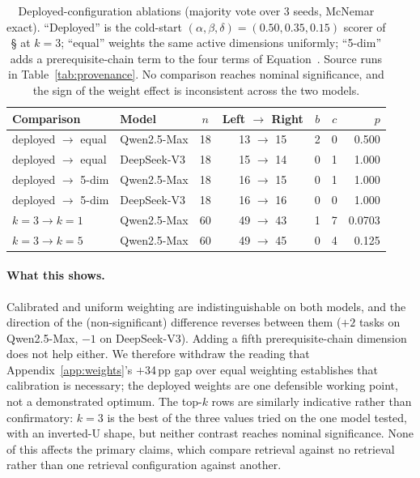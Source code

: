 \documentclass[letterpaper]{article} %
\newcommand{\appref}[1]{Appendix~\ref{#1}}
\newcommand{\bodyref}[1]{\getrefnumber{#1}}
\begin{document}
\begin{table}[htbp]
\centering
\caption{Deployed-configuration ablations (majority vote over 3 seeds,
McNemar exact).  ``Deployed'' is the cold-start
$(\alpha,\beta,\delta){=}(0.50,0.35,0.15)$ scorer of \S\bodyref{sec:scoring} at $k{=}3$;
``equal'' weights the same active dimensions uniformly; ``5-dim'' adds a
prerequisite-chain term to the four terms of Equation~\bodyref{eq:score}.  Source runs in
Table~\ref{tab:provenance}.  No comparison reaches nominal
significance, and the sign of the weight effect is inconsistent across
the two models.}
\label{tab:deployed_ablation}
\small
\begin{tabular}{llccccr}
\toprule
Comparison & Model & $n$ & Left $\rightarrow$ Right & $b$ & $c$ & $p$ \\
\midrule
deployed $\rightarrow$ equal & Qwen2.5-Max & 18 & 13 $\rightarrow$ 15 & 2 & 0 & 0.500 \\
deployed $\rightarrow$ equal & DeepSeek-V3 & 18 & 15 $\rightarrow$ 14 & 0 & 1 & 1.000 \\
deployed $\rightarrow$ 5-dim & Qwen2.5-Max & 18 & 16 $\rightarrow$ 15 & 0 & 1 & 1.000 \\
deployed $\rightarrow$ 5-dim & DeepSeek-V3 & 18 & 16 $\rightarrow$ 16 & 0 & 0 & 1.000 \\
\midrule
$k{=}3 \rightarrow k{=}1$    & Qwen2.5-Max & 60 & 49 $\rightarrow$ 43 & 1 & 7 & 0.0703 \\
$k{=}3 \rightarrow k{=}5$    & Qwen2.5-Max & 60 & 49 $\rightarrow$ 45 & 0 & 4 & 0.125 \\
\bottomrule
\end{tabular}
\end{table}

\paragraph{What this shows.}  Calibrated and uniform weighting are
indistinguishable on both models, and the direction of the
(non-significant) difference reverses between them ($+2$ tasks on
Qwen2.5-Max, $-1$ on DeepSeek-V3).  Adding a fifth prerequisite-chain
dimension does not help either.  We therefore withdraw the reading that
\appref{app:weights}'s $+$34\,pp gap over equal weighting establishes
that calibration is necessary; the deployed weights are one defensible
working point, not a demonstrated optimum.  The top-$k$ rows are
similarly indicative rather than confirmatory: $k{=}3$ is the best of
the three values tried on the one model tested, with an inverted-U
shape, but neither contrast reaches nominal significance.  None of this
affects the primary claims, which compare retrieval against no
retrieval rather than one retrieval configuration against another.
\end{document}
